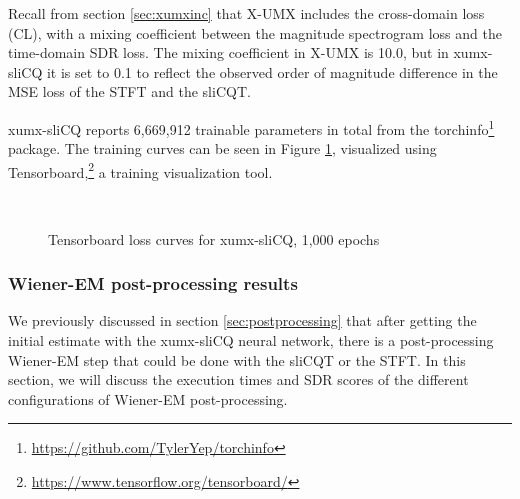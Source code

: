 \documentclass[report.tex]{subfiles}
\begin{document}
Recall from section \ref{sec:xumxinc} that X-UMX includes the cross-domain loss (CL), with a mixing coefficient between the magnitude spectrogram loss and the time-domain SDR loss. The mixing coefficient in X-UMX is 10.0, but in xumx-sliCQ it is set to 0.1 to reflect the observed order of magnitude difference in the MSE loss of the STFT and the sliCQT.

xumx-sliCQ reports 6,669,912 trainable parameters in total from the torchinfo\footnote{\url{https://github.com/TylerYep/torchinfo}} package. The training curves can be seen in Figure \ref{fig:networkloss}, visualized using Tensorboard,\footnote{\url{https://www.tensorflow.org/tensorboard/}} a training visualization tool.

\begin{figure}[ht]
	\centering
	\\
	\caption{Tensorboard loss curves for xumx-sliCQ, 1,000 epochs}
	\label{fig:networkloss}
\end{figure}

\subsubsection{Wiener-EM post-processing results}
\label{sec:wienerconfigs}

We previously discussed in section \ref{sec:postprocessing} that after getting the initial estimate with the xumx-sliCQ neural network, there is a post-processing Wiener-EM step that could be done with the sliCQT or the STFT. In this section, we will discuss the execution times and SDR scores of the different configurations of Wiener-EM post-processing.
\end{document}

